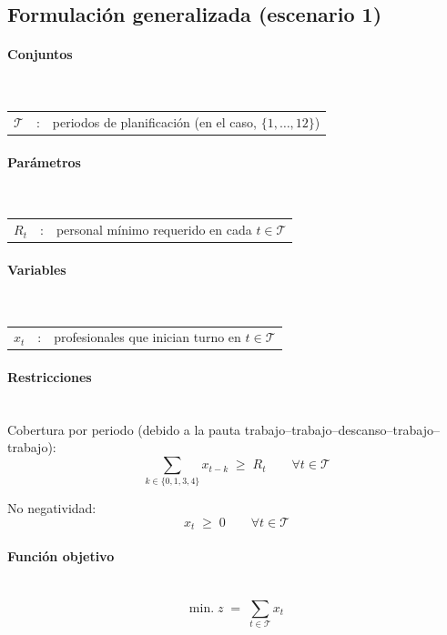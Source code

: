 \subsection{Formulación generalizada (escenario 1)}

\paragraph{Conjuntos}\mbox{}\\
\begin{tabular}{l c l}
    $\mathcal{T}$ & : & periodos de planificación (en el caso, $\{1,\dots,12\}$)\\
\end{tabular}

\paragraph{Parámetros}\mbox{}\\
\begin{tabular}{l c l}
    $R_t$ & : & personal mínimo requerido en cada $t\in\mathcal{T}$\\
\end{tabular}

\paragraph{Variables}\mbox{}\\
\begin{tabular}{l c l}
    $x_t$ & : & profesionales que inician turno en $t\in\mathcal{T}$\\
\end{tabular}

\paragraph{Restricciones}\mbox{}\\
Cobertura por periodo (debido a la pauta trabajo--trabajo--descanso--trabajo--trabajo):
\begin{equation}
    \sum_{k\in\{0,1,3,4\}} x_{t-k} \;\ge\; R_t \qquad \forall t\in\mathcal{T}
\end{equation}

No negatividad:
\begin{equation}
    x_t \;\ge\; 0 \qquad \forall t\in\mathcal{T}
\end{equation}

\paragraph{Función objetivo}\mbox{}\\
\begin{equation}
\mbox{min.}\; z \;=\; \sum_{t\in\mathcal{T}} x_t
\end{equation}

